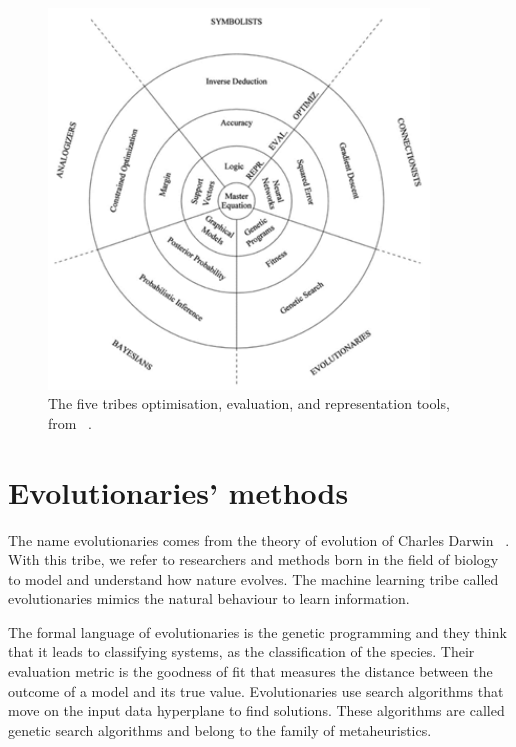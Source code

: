 \begin{figure}[hbt!]
\centering
\includegraphics[width=0.9\textwidth]{SectionLetsMath/nonLinearMethods_fig/fig_tribes.png}
\captionsetup{type=figure}
\caption{The five tribes optimisation, evaluation, and representation tools, from ~\cite{Domingos2015}.}
\label{fig_tribes}
\end{figure}


\section{Evolutionaries’ methods}

The name evolutionaries comes from the theory of evolution of Charles Darwin ~\cite{Darwin1859}. With this tribe, we refer to researchers and methods born in the field of biology to model and understand how nature evolves. The machine learning tribe called evolutionaries mimics the natural behaviour to learn information.\par

The formal language of evolutionaries is the genetic programming and they think that it leads to classifying systems, as the classification of the species. Their evaluation metric is the goodness of fit that measures the distance between the outcome of a model and its true value. Evolutionaries use search algorithms that move on the input data hyperplane to find solutions. These algorithms are called genetic search algorithms and belong to the family of metaheuristics.

